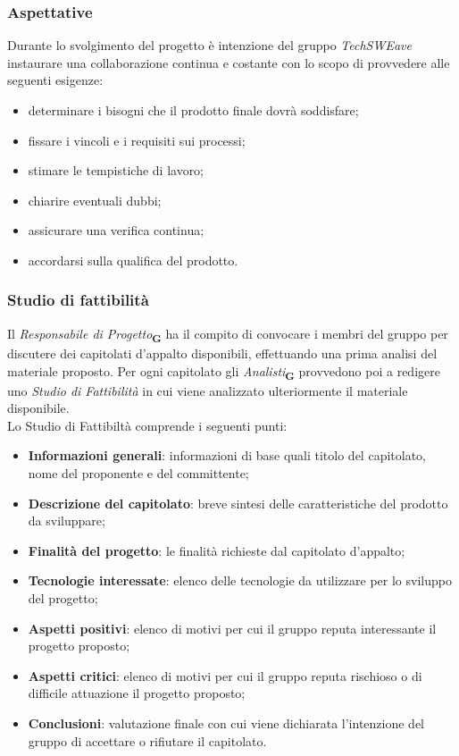 \subsubsection{Aspettative}
Durante lo svolgimento del progetto è intenzione del gruppo \textit{TechSWEave} instaurare una collaborazione continua e costante con lo scopo di provvedere alle seguenti esigenze:
\begin{itemize}
    \item determinare i bisogni che il prodotto finale dovrà soddisfare;
    \item fissare i vincoli e i requisiti sui processi;
    \item stimare le tempistiche di lavoro;
    \item chiarire eventuali dubbi;
    \item assicurare una verifica continua;
    \item accordarsi sulla qualifica del prodotto.
\end{itemize}
\subsubsection{Studio di fattibilità}
Il \textit{Responsabile di Progetto}\textsubscript{\textbf{G}} ha il compito di convocare i membri del gruppo per discutere dei capitolati d'appalto disponibili, effettuando una prima analisi del materiale proposto. Per ogni capitolato gli \textit{Analisti}\textsubscript{\textbf{G}} provvedono poi a redigere uno \textit{Studio di Fattibilità} in cui viene analizzato ulteriormente il materiale disponibile.
\\Lo Studio di Fattibiltà comprende i seguenti punti:
\begin{itemize}
    \item \textbf{Informazioni generali}: informazioni di base quali titolo del capitolato, nome del proponente e del committente;
    \item \textbf{Descrizione del capitolato}: breve sintesi delle caratteristiche del prodotto da sviluppare;
    \item \textbf{Finalità del progetto}: le finalità richieste dal capitolato d'appalto;
    \item \textbf{Tecnologie interessate}: elenco delle tecnologie da utilizzare per lo sviluppo del progetto;
    \item \textbf{Aspetti positivi}: elenco di motivi per cui il gruppo reputa interessante il progetto proposto;
    \item \textbf{Aspetti critici}: elenco di motivi per cui il gruppo reputa rischioso o di difficile attuazione il progetto proposto;
    \item \textbf{Conclusioni}: valutazione finale con cui viene dichiarata l'intenzione del gruppo di accettare o rifiutare il capitolato.
\end{itemize}
